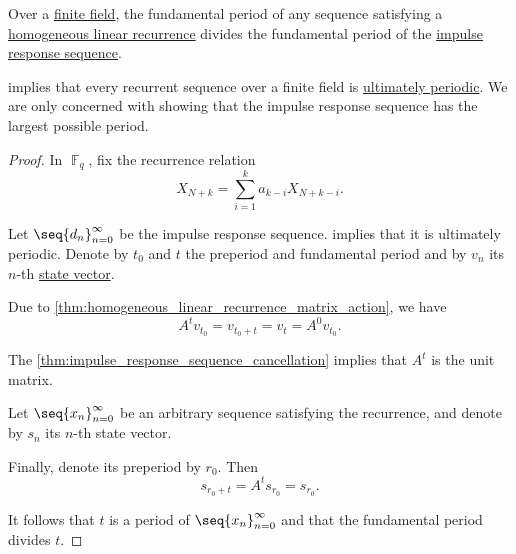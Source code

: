 \begin{proposition}\label{thm:impulse_response_sequence_period}
  Over a \hyperref[def:finite_field]{finite field}, the fundamental period of any sequence satisfying a \hyperref[def:homogeneous_linear_recurrence]{homogeneous linear recurrence} divides the fundamental period of the \hyperref[def:recurrence_relation_space]{impulse response sequence}.
\end{proposition}
\begin{comments}
  \item {} implies that every recurrent sequence over a finite field is \hyperref[def:ultimately_periodic_sequence]{ultimately periodic}. We are only concerned with showing that the impulse response sequence has the largest possible period.
\end{comments}
\begin{proof}
  In \( \BbbF_q \), fix the recurrence relation
  \begin{equation*}
    X_{N+k} = \sum_{i=1}^k a_{k-i} X_{N+k-i}.
  \end{equation*}

  Let \( \seq{ d_n }_{n=0}^\infty \) be the impulse response sequence.  implies that it is ultimately periodic. Denote by \( t_0 \) and \( t \) the preperiod and fundamental period and by \( v_n \) its \( n \)-th \hyperref[def:recurrence_relation/state]{state vector}.

  Due to \cref{thm:homogeneous_linear_recurrence_matrix_action}, we have
  \begin{equation*}
    A^t v_{t_0} = v_{t_0 + t} = v_t = A^0 v_{t_0}.
  \end{equation*}

  The \cref{thm:impulse_response_sequence_cancellation} implies that \( A^t \) is the unit matrix.

  Let \( \seq{ x_n }_{n=0}^\infty \) be an arbitrary sequence satisfying the recurrence, and denote by \( s_n \) its \( n \)-th state vector.

  Finally, denote its preperiod by \( r_0 \). Then
  \begin{equation*}
    s_{r_0 + t}
    =
    A^t s_{r_0}
    =
    s_{r_0}.
  \end{equation*}

  It follows that \( t \) is a period of \( \seq{ x_n }_{n=0}^\infty \) and that the fundamental period divides \( t \).
\end{proof}

